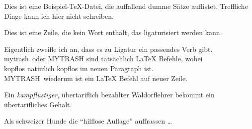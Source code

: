 \documentclass{article}
\newcommand{\auffahre}{mytrash}
\newcommand{\kopflos}{MYTRASH}
\begin{document}
Dies ist eine Beispiel-\TeX-Datei, die auffallend dumme Sätze auflistet.
Treffliche Dinge kann ich hier nicht schreiben.

Dies ist eine Zeile, die kein Wort enthält, das ligaturisiert werden kann.

Eigentlich zweifle ich an, dass es zu Ligatur ein passendes Verb gibt.
\auffahre\ oder \kopflos{} sind tatsächlich \LaTeX{} Befehle, wobei \\kopflos
natürlich kopflos im neuen Paragraph ist. \\\kopflos\ wiederum ist ein
\LaTeX{} Befehl auf neuer Zeile.

Ein \emph{kampflustiger}, übertariflich bezahlter Waldorflehrer bekommt
ein übertarifliches Gehalt.

Als schweizer Hunde die "`hilflose Auflage"' auffrassen \ldots
\end{document}
